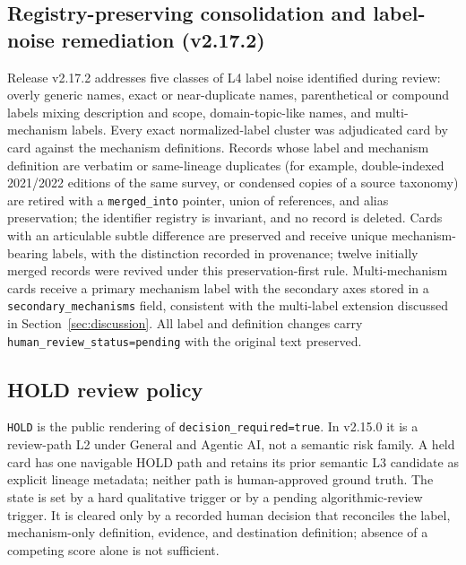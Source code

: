 \documentclass[11pt,a4paper]{article}
\newcommand{\code}[1]{\texttt{#1}}
\begin{document}
\subsection{Registry-preserving consolidation and label-noise remediation (v2.17.2)}
\label{sec:consolidation}

Release v2.17.2 addresses five classes of L4 label noise identified during
review: overly generic names, exact or near-duplicate names, parenthetical or
compound labels mixing description and scope, domain-topic-like names, and
multi-mechanism labels. Every exact normalized-label cluster was adjudicated
card by card against the mechanism definitions. Records whose label and
mechanism definition are verbatim or same-lineage duplicates (for example,
double-indexed 2021/2022 editions of the same survey, or condensed copies of a
source taxonomy) are retired with a \code{merged\_into} pointer, union of
references, and alias preservation; the identifier registry is invariant, and
no record is deleted. Cards with an articulable subtle difference are
preserved and receive unique mechanism-bearing labels, with the distinction
recorded in provenance; twelve initially merged records were revived under
this preservation-first rule. Multi-mechanism cards receive a primary
mechanism label with the secondary axes stored in a
\code{secondary\_mechanisms} field, consistent with the multi-label extension
discussed in Section~\ref{sec:discussion}. All label and definition changes
carry \code{human\_review\_status=pending} with the original text preserved.

\subsection{HOLD review policy}
\label{sec:hold}

\code{HOLD} is the public rendering of \code{decision\_required=true}. In
v2.15.0 it is a review-path L2 under General and Agentic AI, not a semantic risk
family. A held card has one navigable HOLD path and retains its prior semantic
L3 candidate as explicit lineage metadata; neither path is human-approved
ground truth. The state is set by a hard qualitative
trigger or by a pending algorithmic-review trigger. It is cleared only by a
recorded human decision that reconciles the label, mechanism-only definition,
evidence, and destination definition; absence of a competing score alone is
not sufficient.
\end{document}
